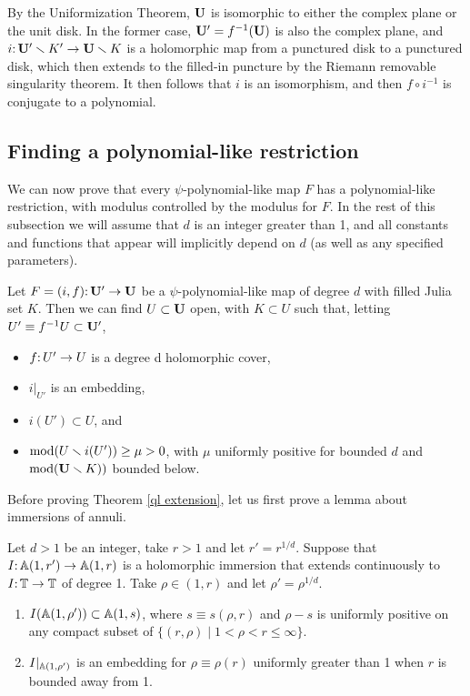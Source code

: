 \begin{rem} \label{psi-plane}
By the Uniformization Theorem,
$\mathbf U$ is isomorphic to either the complex plane or the unit disk.
In the former case, 
$\mathbf U' = f^{-1}(\mathbf U)$ is also the complex plane,
and $i\mathpunct: \mathbf U'\smallsetminus K'\to \mathbf U\smallsetminus K$ is a holomorphic map from a punctured disk to a punctured disk, 
which then extends to the filled-in puncture by the Riemann removable singularity theorem.
It then follows that $i$ is an isomorphism, and then $f\circ i^{-1}$ is conjugate to a polynomial. 
\end{rem}


\subsection{Finding a polynomial-like restriction} \label{psi-pl}
We can now prove that every $\psi$-polynomial-like map $F$ has a polynomial-like restriction, 
with modulus controlled by the modulus for $F$. 
In the rest of this subsection we will assume that $d$ is an integer greater than 1,
and all constants and functions that appear will implicitly depend on $d$ (as well as any specified parameters). 

\begin{theorem}\label{ql extension}
Let $F=(i,f)\mathpunct:\mathbf U'\to \mathbf U$ be a $\psi$-polynomial-like map of degree $d$
 with filled Julia set $K$.
Then  we can find $U \subset \mathbf U$ open, with $K \subset U$
such that,
letting $U' \equiv f^{-1} U \subset \mathbf U'$,
\begin{itemize}
\item
$f \mathpunct: U'\to U$ is a degree d holomorphic cover,
\item
$i|_{U'}$ is an embedding,
\item
$i(U') \subset U$, and
\item
$\operatorname{mod}(U\smallsetminus i(U'))\geq \mu > 0$,
with $\mu$ uniformly positive for bounded $d$ and $\operatorname{mod}(\mathbf U\smallsetminus K))$ bounded below.
\end{itemize}
\end{theorem}

\renewcommand{\aa}[1]{\A(1, #1)}
\newcommand{\aaa}[1]{\A(1/#1, #1)}


Before proving Theorem \ref{ql extension},
let us first prove a lemma about immersions of annuli.


\begin{lem} \label{lem:ann-immerse}
Let $d >1$ be an integer, take $r > 1$ and let $r' = r^{1/d}$. 
Suppose that $I\from \aa{r'} \to \aa{r}$ is a holomorphic immersion that extends continuously to $I\mathpunct: {\Bbb T} \to {\Bbb T}$ of degree 1.
Take $\rho \in (1, r)$ and let $\rho' = \rho^{1/d}$.
\begin{enumerate}
\item \label{ai:s}
$I(\aa{\rho'}) \subset \aa s$,
where $s \equiv s(\rho, r)$ and $\rho - s$ is uniformly positive on any compact subset of $\{ (r, \rho) \mid 1 < \rho < r \le \infty \}$.
\item \label{ai:emb}
$I|_{\aa {\rho'}}$ is an embedding for $\rho \equiv \rho(r)$ uniformly greater than 1 when $r$ is bounded away from 1.
\end{enumerate}
\end{lem}

